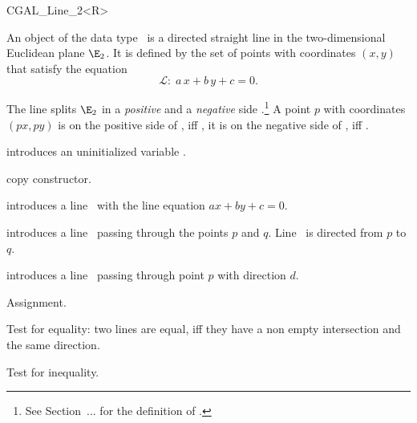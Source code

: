 
\begin{ccClassTemplate} {CGAL_Line_2<R>}

\ccDefinition
An object  of the data type \ccClassName\ is a directed
straight line in the two-dimensional Euclidean plane $\E_2$. It is
defined by the set of points with coordinates $(x,y)$ that satisfy the
equation 
\[ {\mathcal L}:\; a\, x +b\, y +c = 0. \]
 
The line splits $\E_2$ in a {\em positive} and a {\em negative}
side%
.\footnote{See Section~... for the definition of 
.}
A point $p$ with coordinates $(px, py)$
is on the positive side of , iff
, it is
on the negative side of , iff 
.

\ccCreation
{}


\ccHidden {}
             {introduces an uninitialized variable \ccVar.}

\ccHidden {}
            {copy constructor.}

            {introduces a line \ccVar\ with the line equation $ax +by +c = 0$.}

            {introduces a line \ccVar\ passing through the points $p$ and $q$. 
             Line \ccVar\ is directed from $p$ to $q$.}

            {introduces a line \ccVar\ passing through point $p$ with 
             direction $d$.}

\ccOperations
\ccSetTwoOfThreeColumns{5cm}{4cm}

\ccHidden {}
        {Assignment.}

       {Test for equality: two lines are equal, iff they have a non 
        empty intersection and the same direction.}

       {Test for inequality.}



\end{ccClassTemplate}
